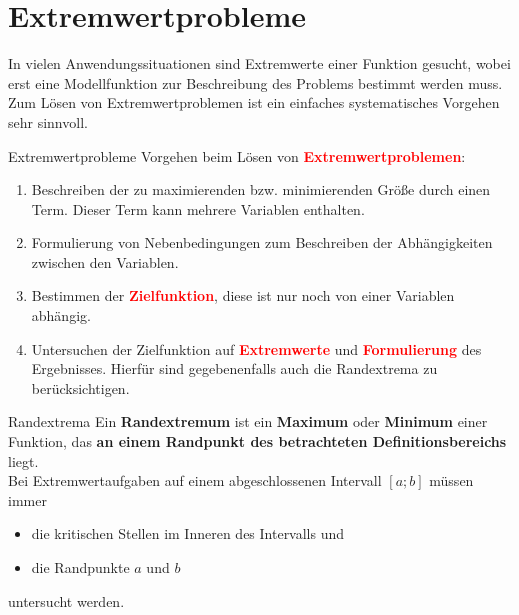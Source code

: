 \section{Extremwertprobleme} 
   In vielen Anwendungssituationen sind Extremwerte einer Funktion gesucht, wobei erst eine Modellfunktion zur Beschreibung des Problems bestimmt werden muss. Zum Lösen von Extremwertproblemen ist ein einfaches systematisches Vorgehen sehr sinnvoll.  
   \begin{defi}{Extremwertprobleme}{}
Vorgehen beim Lösen von \textbf{\textcolor{red}{Extremwertproblemen}}:
\begin{enumerate}
    \item Beschreiben der zu maximierenden bzw. minimierenden Größe durch einen Term. Dieser Term kann mehrere Variablen enthalten.
    \item Formulierung von Nebenbedingungen zum Beschreiben der Abhängigkeiten zwischen den Variablen.
    \item Bestimmen der \textbf{\textcolor{red}{Zielfunktion}}, diese ist nur noch von einer Variablen abhängig.
    \item Untersuchen der Zielfunktion auf \textbf{\textcolor{red}{Extremwerte}} und \textbf{\textcolor{red}{Formulierung}} des Ergebnisses. Hierfür sind gegebenenfalls auch die Randextrema zu berücksichtigen.
\end{enumerate}
   \end{defi}
   \begin{merke}{Randextrema}{}
    Ein \textbf{Randextremum} ist ein \textbf{Maximum} oder \textbf{Minimum} einer Funktion, das \textbf{an einem Randpunkt des betrachteten Definitionsbereichs} liegt.\\
    Bei Extremwertaufgaben auf einem abgeschlossenen Intervall \( [a;b] \) m\"ussen immer
\begin{itemize}[leftmargin=1.5em]
    \item die kritischen Stellen im Inneren des Intervalls und
    \item die Randpunkte \(a\) und \(b\)
\end{itemize}
untersucht werden.   
   \end{merke}
